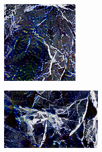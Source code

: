 \begin{figure}[]
\begin{subfigure}{0.6\textwidth}
\begin{subfigure}{0.48\textwidth}
            \hfill
            \begin{subfigure}{0.6\textwidth}
                \centering
                \includegraphics[width=\textwidth]{images/04-experiment02/human/marble/improved_proj_crop_green.jpeg}
                \caption*{}
            \end{subfigure}

            \begin{subfigure}{\textwidth}
                \centering
                \includegraphics[width=\textwidth]{images/04-experiment02/human/marble/improved_proj_crop_yellow.jpeg}
                \caption*{}
            \end{subfigure}
        \end{subfigure}
    \end{subfigure}


\end{figure}
